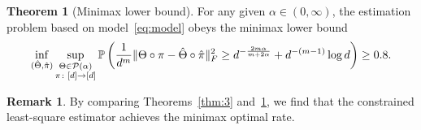 \documentclass[11pt]{article}
\theoremstyle{definition}
\newtheorem{thm}{Theorem}
\newtheorem{rmk}{Remark}
\begin{document}
\begin{thm}[Minimax lower bound]\label{thm:minimax}For any given $\alpha\in(0,\infty)$, the estimation problem based on model~\eqref{eq:model} obeys the minimax lower bound 
\begin{equation}\label{eq:minimax}
\inf_{(\hat \Theta,\hat \pi)}\sup_{\substack{\Theta\in \mathcal{P}(\alpha)\\ \pi\colon[d]\to[d]}} \mathbb{P}\left({1\over d^m}\lVert\Theta\circ \pi-\hat \Theta\circ \hat \pi\rVert_F^2 \geq d^{-{2m\alpha\over m+2\alpha}}+d^{-(m-1)}\log d \right) \geq 0.8.
\end{equation}
\end{thm}
\begin{rmk} By comparing Theorems~\ref{thm:3} and~\ref{thm:minimax}, we find that the constrained least-square estimator achieves the minimax optimal rate. 
\end{rmk}
\end{document}
